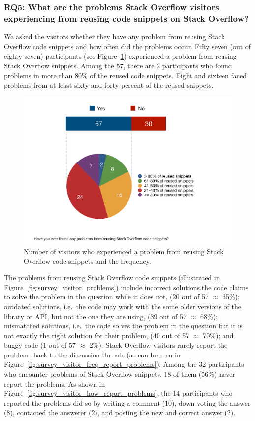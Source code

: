 \documentclass{svjour3}                     %
\begin{document}
\subsubsection*{RQ5: What are the problems Stack Overflow visitors experiencing from reusing code snippets on Stack Overflow?}

We asked the visitors whether they have any problem from reusing Stack Overflow
code snippets and how often did the problems occur.  Fifty seven (out of eighty seven) participants (see Figure~\ref{fig:survey_v_problems})
experienced a problem from reusing Stack Overflow snippets. Among the 57, there are 2 participants who found problems in more than 80\%
of the reused code snippets. Eight and sixteen faced problems from at least sixty and forty percent of the reused snippets.


\begin{figure} \centering
	\includegraphics[width=.4\linewidth]{survey_v_problems} 
	\caption{Number of visitors who experienced a problem from reusing Stack Overflow code snippets and the frequency.}
	\label{fig:survey_v_problems} 
\end{figure}

The problems from reusing Stack Overflow code snippets (illustrated in
Figure~\ref{fig:survey_visitor_problems}) include incorrect solutions,the code
claims to solve the problem in the question while it does not,  (20 out of 57
$\approx$ 35\%); outdated solutions, i.e.~the code may work with the some older
versions of the library or API, but not the one they are using, (39 out of 57
$\approx$ 68\%); mismatched solutions, i.e.~the code solves the problem in the
question but it is not exactly the right solution for their problem, (40 out of
57 $\approx$ 70\%); and buggy code (1 out of 57 $\approx$ 2\%). Stack Overflow
visitors rarely report the problems back to the discussion threads (as can be
seen in Figure~\ref{fig:survey_visitor_freq_report_problems}). Among the 32
participants who encounter problems of Stack Overflow snippets, 18 of them
(56\%) never report the problems. As shown in
Figure~\ref{fig:survey_visitor_how_report_problems}, the 14 participants who
reported the problems did so by writing a comment (10), down-voting the answer
(8), contacted the answerer (2), and posting the new and correct answer (2).
\end{document}
